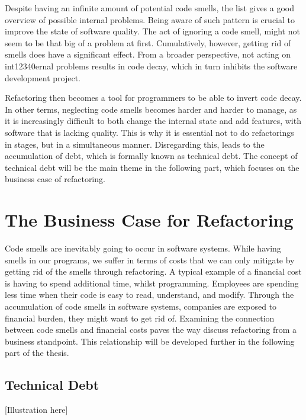 Despite having an infinite amount of potential code smells,
	the list gives a good overview of possible internal problems.
Being aware of such pattern is crucial
	to improve the state of software quality.
The act of ignoring a code smell, 
	might not seem to be that big of a problem at first. 
Cumulatively, however, 
	getting rid of smells does have a significant effect.
From a broader perspective, not acting on int12340ernal problems results in
	code decay, which in turn inhibits the software development project. 

Refactoring then becomes a tool for programmers to be able to invert code decay.
In other terms, 
	neglecting code smells becomes harder and harder to manage, 
	as it is increasingly difficult to both change the internal state and 
	add features, with software that is lacking quality. 
This is why it is essential not to do refactorings in stages, 
	but in a simultaneous manner.
Disregarding this, 
	leads to the accumulation of debt, 
	which is formally known as technical debt. 
The concept of technical debt will be the main theme 
	in the following part, 
	which focuses on the business case of refactoring.



\chapter{The Business Case for Refactoring}
\label{sec:Business}
Code smells are inevitably going to occur in software systems. 
While having smells in our programs,
	we suffer in terms of costs that we can only mitigate 
	by getting rid of the smells through refactoring. 
A typical example of a financial cost is 
	having to spend additional time, whilst programming. 
Employees are spending less time 
	when their code is easy to read, understand, and modify.
Through the accumulation of code smells in software systems, companies are exposed to financial burden, they might want to get rid of.
Examining the connection between code smells and financial costs 
	paves the way discuss refactoring from a business standpoint.
This relationship will be developed further in the following part of the thesis.  

\section{Technical Debt}
[Illustration here]

